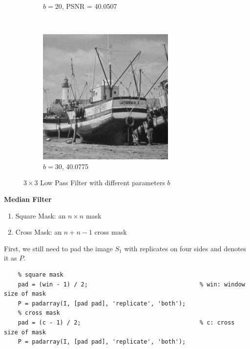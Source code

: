 \documentclass{article}
\newcommand{\tb}{\textbf}
\begin{document}
\begin{enumerate}[label=(\alph*)]
\begin{figure}[!htb]
\begin{subfigure}[b]{0.3\textwidth}
            \caption{$b = 20$, PSNR = 40.0507}
        \end{subfigure}
        ~
        \begin{subfigure}[b]{0.3\textwidth}
            \includegraphics[width=\textwidth]{img/RG30.png}
            \caption{$b = 30$, 40.0775}
        \end{subfigure}
        \caption{$3 \times 3$ Low Pass Filter with different parameters $b$}
        \label{3 x 3 Low Pass Filter with different parameters $b$}        
    \end{figure}

    \newpage
    \tb{Median Filter}
    \begin{enumerate}[label=(\roman*)]
        \item Square Mask: an $n \times n$ mask
        \item Cross Mask: an $n + n - 1$ cross mask 
    \end{enumerate}
    
    First, we still need to pad the image $S_1$ with replicates on four sides and denotes it as $P$.

\begin{lstlisting}
    % square mask
    pad = (win - 1) / 2;                                % win: window size of mask
    P = padarray(I, [pad pad], 'replicate', 'both');
    % cross mask
    pad = (c - 1) / 2;                                  % c: cross size of mask
    P = padarray(I, [pad pad], 'replicate', 'both');
\end{lstlisting}


\end{enumerate}
\end{document}
